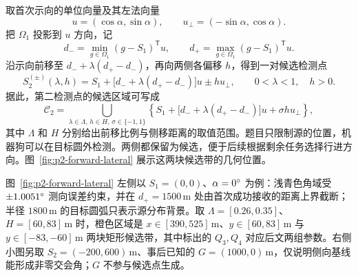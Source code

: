 取首次示向的单位向量及其左法向量
\[
  u=(\cos\alpha,\sin\alpha),\qquad
  u_\perp=(-\sin\alpha,\cos\alpha).
\]
把 \(\Omega_1\) 投影到 \(u\) 方向，记
\begin{equation}
  d_-=\min_{g\in\Omega_1}(g-S_1)^{\mathsf T}u,
  \qquad
  d_+=\max_{g\in\Omega_1}(g-S_1)^{\mathsf T}u.
  \label{eq:p2-projections}
\end{equation}
沿示向前移至 \(d_-+\lambda(d_+-d_-)\)，再向两侧各偏移 \(h\)，得到一对候选检测点
\begin{equation}
  S_2^{(\pm)}(\lambda,h)=S_1+
  \bigl[d_-+\lambda(d_+-d_-)\bigr]u
  \pm h u_\perp,
  \qquad 0<\lambda<1,\quad h>0.
  \label{eq:p2-candidate-pair}
\end{equation}
据此，第二检测点的候选区域可写成
\begin{equation}
  \mathcal{C}_2=
  \bigcup_{\lambda\in\Lambda,\,h\in H,\,\sigma\in\{-1,1\}}
  \left\{S_1+\bigl[d_-+\lambda(d_+-d_-)\bigr]u
  +\sigma h u_\perp\right\},
  \label{eq:p2-candidate-region}
\end{equation}
其中 \(\Lambda\) 和 \(H\) 分别给出前移比例与侧移距离的取值范围。题目只限制源的位置，机器狗可以在目标圆外检测。两侧都保留为候选，便于后续根据剩余任务选择行进方向。图~\ref{fig:p2-forward-lateral} 展示这两块候选带的几何位置。


图~\ref{fig:p2-forward-lateral} 左侧以 \(S_1=(0,0)\)、\(\alpha=0^{\circ}\) 为例：浅青色角域受 \(\pm1.0051^{\circ}\) 测向误差约束，并在 \(d_+=1500\,\mathrm m\) 处由首次成功接收的距离上界截断；半径 \(1800\,\mathrm m\) 的目标圆弧只表示源分布背景。取 \(\Lambda=[0.26,0.35]\)、\(H=[60,83]\,\mathrm m\) 时，橙色区域是 \(x\in[390,525]\,\mathrm m\)、\(y\in[60,83]\,\mathrm m\) 与 \(y\in[-83,-60]\,\mathrm m\) 两块矩形候选带，其中标出的 \(Q_3,Q_4\) 对应后文两组参数。右侧小图另取 \(S_2=(-200,600)\,\mathrm m\)、事后已知的 \(G=(1000,0)\,\mathrm m\)，仅说明侧向基线能形成非零交会角；\(G\) 不参与候选点生成。

